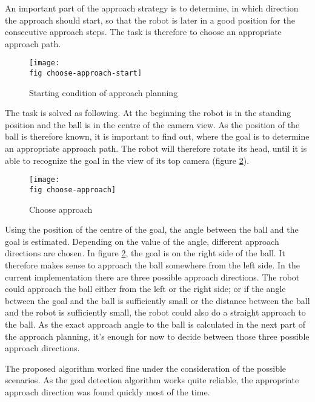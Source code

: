 An important part of the approach strategy is to determine, in which direction
the approach should start, so that the robot is later in a good position for
the consecutive approach steps. The task is therefore to choose an appropriate
approach path.


\begin{figure}[ht]
  \texttt{[image: \\fig choose-approach-start]}
  \caption{Starting condition of approach planning}
  \label{j figure starting condition choose-approach}
\end{figure}

The task is solved as following. At the beginning the robot is in the standing
position and the ball is in the centre of the camera view. As the position of
the ball is therefore known, it is important to find out, where the goal is to
determine an appropriate approach path. The robot will therefore rotate its
head, until it is able to recognize the goal in the view of its top camera
(figure \ref{j figure choose-approach}).

\begin{figure}[ht]
  \texttt{[image: \\fig choose-approach]}
  \caption{Choose approach}
  \label{j figure choose-approach}
\end{figure}

Using the position of the centre of the goal, the angle between the ball and
the goal is estimated. Depending on the value of the angle, different approach
directions are chosen. In figure \ref{j figure choose-approach}, the goal
is on the right side of the ball. It therefore makes sense to approach the ball
somewhere from the left side. In the current implementation there are three
possible approach directions. The robot could approach the ball either from the
left or the right side; or if the angle between the goal and the ball is
sufficiently small or the distance between the ball and the robot is sufficiently small, the robot could also do a straight approach to the ball. As
the exact approach angle to the ball is calculated in the next part of the
approach planning, it's enough for now to decide between those three possible
approach directions.

The proposed algorithm worked fine under the consideration of the
possible scenarios. As the goal detection algorithm works quite reliable, the
appropriate approach direction was found quickly most of the time.


